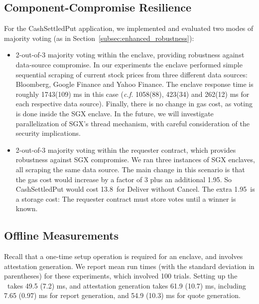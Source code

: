 \subsection{Component-Compromise Resilience}
\label{subsec:hedging}
For the {\sf CashSettledPut} application, 
we implemented and evaluated two modes of majority voting (as in Section~\ref{subsec:enhanced_robustness}):
\begin{itemize}[leftmargin=3mm]
  \setlength{\itemsep}{2pt}
  \setlength{\parskip}{0pt}
  \setlength{\parsep}{0pt}
\item
2-out-of-3 majority voting within the enclave, providing robustness
against data-source compromise. 
In our experiments
the enclave performed simple sequential scraping of current stock prices 
from three different data sources: Bloomberg, Google Finance and Yahoo Finance.
The enclave response time is roughly
1743(109) ms in this case ({\it c.f.}  
1058(88), 423(34) and 262(12) ms for 
each respective data source). Finally, there is no change in gas cost, as voting is done
inside the SGX enclave.
In the future, we will investigate parallelization of SGX's thread mechanism, with careful consideration of the security implications.


\item
2-out-of-3 majority voting within the requester contract,
which provides robustness against 
SGX compromise.
We ran three instances of SGX enclaves, all scraping
the same data source.  
The main change in this scenario is that 
the gas cost would increase by a factor of 3 plus an additional 1.95\textcent.
So {\sf CashSettledPut} would cost 13.8\textcent\ for Deliver without Cancel.
The extra 1.95\textcent\ is a storage cost: The requester contract must store votes
until a winner is known.
\end{itemize}

\vspace{-2mm}

\subsection{Offline Measurements}
Recall that a one-time setup operation is required 
for an enclave, and involves attestation generation. We report mean run times (with the standard deviation in parentheses) for these experiments, which involved 100 trials.
Setting up the \tc~\encname takes
49.5 (7.2) ms,
and attestation generation takes 
61.9 (10.7) ms, including
7.65 (0.97) ms for report generation, 
and 54.9 (10.3) ms for quote generation.

